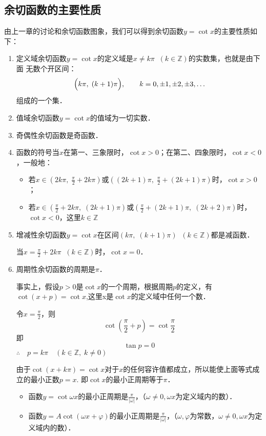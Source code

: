 \subsection{余切函数的主要性质}

由上一章的讨论和余切函数图象，我们可以得到余切函数$y=\cot x$的主要性质如下：
\begin{enumerate}
    \item 定义域\quad 余切函数$y=\cot x$的定义域是$x\ne k\pi\;\;(k\in\mathbb{Z})$的实数集，也就是由下面
无数个开区间：
\[\Bigl(k\pi,\; (k+1)\pi\Bigr), \qquad k=0,\pm1,\pm2,\pm3,\ldots\]
组成的一个集．

\item 值域\quad 余切函数$y=\cot x$的值域为一切实数．
\item 奇偶性\quad 余切函数是奇函数．
\item 函数的符号\quad 当$x$在第一、三象限时，$\cot x>0$；在第二、四象限时，$\cot x<0$，一般地：
\begin{itemize}
    \item 若$x\in\left(2k\pi,\;\frac{\pi}{2}+2k\pi\right)$或$\left((2k+1)\pi,\;\frac{\pi}{2}+(2k+1)\pi\right)$时，$\cot x>0$；
    \item 若$x\in\left(\frac{\pi}{2}+2k\pi,\; (2k+1)\pi\right)$或$\left(\frac{\pi}{2}+(2k+1)\pi,\; (2k+2)\pi\right)$时，$\cot x<0$，这里$k\in\mathbb{Z}$
\end{itemize}

\item 增减性\quad 余切函数$y=\cot x$在区间$(k\pi,\; (k+1)\pi)\;\; (k\in\mathbb{Z})$都是减函数．

当$x=\frac{\pi}{2}+2k\pi\;\; (k\in\mathbb{Z})$时，$\cot x=0$．

\item 周期性\quad 余切函数的周期是$\pi$．

事实上，假设$p>0$是$\cot x$的一个周期，根据周期$p$的定义，有$\cot (x+p)=\cot x$,这里x是$\cot x$的定义域中任何一个数．

令$x=\frac{\pi}{2}$，则
\[\cot\left(\frac{\pi}{2}+p\right)=\cot\frac{\pi}{2}\]
即$$\tan p=0$$
$\therefore\quad p=k\pi\quad (k\in\mathbb{Z},\; k\ne 0)$

由于$\cot(x+k\pi)=\cot x$对于$x$的任何容许值都成立，所以能使上面等式成立的最小正数$p=x$. 即$\cot x$的最小正周期等于$\pi$．

\begin{itemize}
    \item 函数$y=\cot \omega x$的最小正周期是$\frac{\pi}{|\omega|}$，（$\omega\ne 0, \omega x$为定义域内的数）．
    \item 函数$y=A\cot (\omega x+\varphi)$的最小正周期是$\frac{\pi}{|\omega|}$，（$\omega,\varphi$为常数，$\omega\ne 0, \omega x$为定义域内的数）．
\end{itemize}


\end{enumerate}
